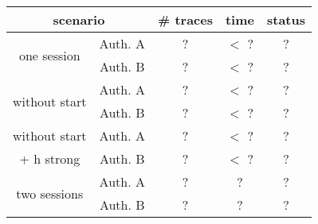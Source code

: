 \documentclass{article}
\begin{document}
\begin{center}
\begin{tabular}{|c|c|c|c|c|}
\hline
\multicolumn{2}{|c|}{scenario} & \# traces & time & status \\ \hline
\multirow{2}{*}{one session} & Auth. A & ? & $<$ ? & ? \\ 
& Auth. B & ? & $<$ ? & ? \\  \hline
\multirow{2}{*}{without start} & Auth. A & ? & $<$ ? & ? \\ 
& Auth. B & ? & $<$ ? & ? \\  \hline
without start & Auth. A & ? & $<$ ? & ? \\ 
+ h strong & Auth. B & ? & $<$ ? & ? \\  \hline
\multirow{2}{*}{two sessions} & Auth. A & ? & ? & ? \\ 
& Auth. B & ? & ? & ? \\  \hline
\end{tabular}
\end{center}
\end{document}
